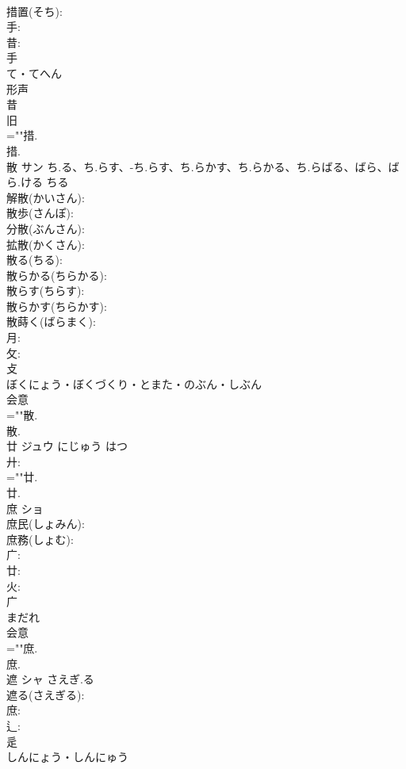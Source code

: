 \documentclass[8pt]{extreport}
\begin{document}
\begin{CJK}{UTF8}{min}
\\	措置(そち): 
\\	手: 
\\	昔: 
\\	手	
\\	て・てへん	
\\	形声 
\\	昔 
\\	旧 
\\	=""措.
\\	措.
\\	散	サン	ち.る、ち.らす、-ち.らす、ち.らかす、ち.らかる、ち.らばる、ばら、ばら.ける	ちる	
\\	解散(かいさん): 
\\	散歩(さんぽ): 
\\	分散(ぶんさん): 
\\	拡散(かくさん): 
\\	散る(ちる): 
\\	散らかる(ちらかる): 
\\	散らす(ちらす): 
\\	散らかす(ちらかす): 
\\	散蒔く(ばらまく): 
\\	月: 
\\	攵: 
\\	攴	
\\	ぼくにょう・ぼくづくり・とまた・のぶん・しぶん	
\\	会意 
\\	=""散.
\\	散.
\\	廿	ジュウ	にじゅう	はつ	
\\	廾: 
\\	=""廿.
\\	廿.
\\	庶	ショ			
\\	庶民(しょみん): 
\\	庶務(しょむ): 
\\	广: 
\\	廿: 
\\	火: 
\\	广	
\\	まだれ	
\\	会意 
\\	=""庶.
\\	庶.
\\	遮	シャ	さえぎ.る		
\\	遮る(さえぎる): 
\\	庶: 
\\	辶: 
\\	辵	
\\	しんにょう・しんにゅう	

\end{CJK}
\end{document}

